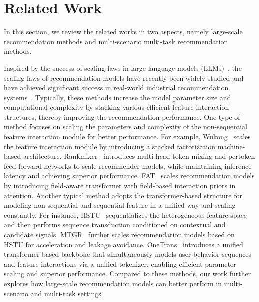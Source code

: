 \section{Related Work}
\label{sec-rel}
In this section, we review the related works in two aspects, namely large-scale recommendation methods and multi-scenario multi-task recommendation methods.

Inspired by the success of scaling laws in large language models (LLMs)~\cite{LLM1,LLM2}, the scaling laws of recommendation models have recently been widely studied and have achieved significant success in real-world industrial recommendation systems~\cite{wukong,RankMixer,KGBRank,HSTU,MTGR,OneTrans,hyformer}.
Typically, these methods increase the model parameter size and computational complexity by stacking various efficient feature interaction structures, thereby improving the recommendation performance.
One type of method focuses on scaling the parameters and complexity of the non-sequential feature interaction module for better performance.
For example, Wukong~\cite{wukong} scales the feature interaction module by introducing a stacked factorization machine-based architecture.
Rankmixer~\cite{RankMixer} introduces multi-head token mixing and pertoken feed-forward networks to scale recommender models, while maintaining inference latency and achieving superior performance.
FAT~\cite{KGBRank} scales recommendation models by introducing field-aware transformer with field-based interaction priors in attention.
Another typical method adopts the transformer-based structure for modeling non-sequential and sequential feature in a unified way and scaling constantly.
For instance, HSTU~\cite{HSTU} sequentializes the heterogeneous feature space and then performs sequence transduction conditioned on contextual and candidate signals.
MTGR~\cite{MTGR} further scales recommendation models based on HSTU  for acceleration and leakage avoidance.
OneTrans~\cite{OneTrans} introduces a unified transformer-based backbone that simultaneously models user-behavior sequences and feature interactions via a unified tokenizer, enabling efficient parameter scaling and superior performance.
Compared to these methods, our work further explores how large-scale recommendation models can better perform in multi-scenario and multi-task settings.

